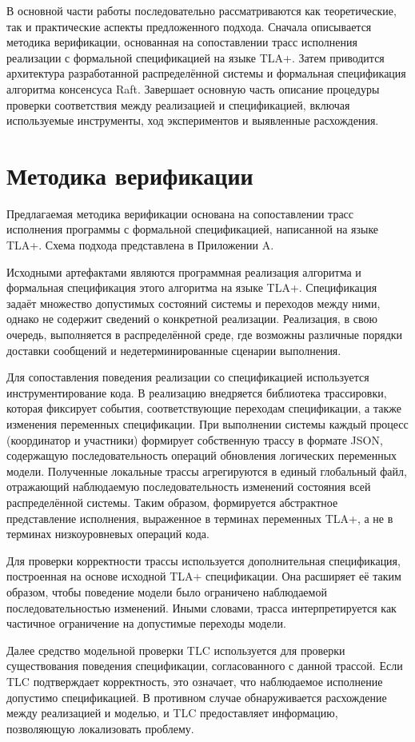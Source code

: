 
В основной части работы последовательно рассматриваются как теоретические,
так и практические аспекты предложенного подхода. Сначала описывается методика
верификации, основанная на сопоставлении трасс исполнения реализации с
формальной спецификацией на языке TLA+. Затем приводится архитектура
разработанной распределённой системы и формальная спецификация алгоритма
консенсуса Raft. Завершает основную часть описание процедуры проверки
соответствия между реализацией и спецификацией, включая используемые
инструменты, ход экспериментов и выявленные расхождения.

\section{Методика верификации}

Предлагаемая методика верификации основана на сопоставлении трасс исполнения
программы с формальной спецификацией, написанной на языке TLA+. Схема подхода
представлена в Приложении A.

Исходными артефактами являются программная реализация алгоритма и формальная
спецификация этого алгоритма на языке TLA+. Спецификация задаёт множество
допустимых состояний системы и переходов между ними, однако не содержит
сведений о конкретной реализации. Реализация, в свою очередь, выполняется в
распределённой среде, где возможны различные порядки доставки сообщений и
недетерминированные сценарии выполнения.

Для сопоставления поведения реализации со спецификацией используется
инструментирование кода. В реализацию внедряется библиотека трассировки,
которая фиксирует события, соответствующие переходам спецификации, а также
изменения переменных спецификации. При выполнении системы каждый процесс
(координатор и участники) формирует собственную трассу в формате JSON,
содержащую последовательность операций обновления логических переменных модели.
Полученные локальные трассы агрегируются в единый глобальный файл, отражающий
наблюдаемую последовательность изменений состояния всей распределённой системы.
Таким образом, формируется абстрактное представление исполнения, выраженное в
терминах переменных TLA+, а не в терминах низкоуровневых операций кода.

Для проверки корректности трассы используется дополнительная спецификация,
построенная на основе исходной TLA+ спецификации. Она расширяет её таким
образом, чтобы поведение модели было ограничено наблюдаемой последовательностью
изменений. Иными словами, трасса интерпретируется как частичное ограничение на
допустимые переходы модели.

Далее средство модельной проверки TLC используется для проверки существования
поведения спецификации, согласованного с данной трассой. Если TLC подтверждает
корректность, это означает, что наблюдаемое исполнение допустимо спецификацией.
В противном случае обнаруживается расхождение между реализацией и моделью, и
TLC предоставляет информацию, позволяющую локализовать проблему.

